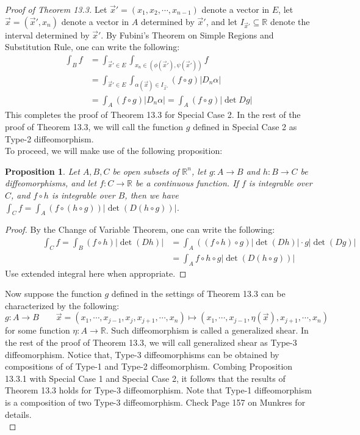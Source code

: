 \documentclass[15pt]{book}
\theoremstyle{break}
\theoremstyle{break}
\newtheorem{prop}[lem]{Proposition}
\newcommand{\R}{\mathbb{R}}
\begin{document}
\begin{proof}[Proof of Theorem 13.3]
Let $\vec{x}' = (x_1,x_2,\cdots,x_{n-1})$ denote a vector in $E$, let $\vec{x} = (\vec{x}',x_n)$ denote a vector in $A$ determined by $\vec{x}'$, and let $I_{\vec{x}'}\subseteq \R$ denote the interval determined by $\vec{x}'$. By Fubini's Theorem on Simple Regions and Substitution Rule, one can write the following:
\begin{align*}
\int_B f &= \int_{\vec{x}' \in E} \int_{x_n \in (\phi(\vec{x}'), \psi(\vec{x}'))} f \\
&= \int_{\vec{x}' \in E} \int_{\alpha(\vec{x}) \in I_{\vec{x}'}} (f\circ g) |D_n\alpha| \\
&= \int_A (f\circ g) |D_n\alpha| = \int_A (f\circ g) |\det Dg|
\end{align*}
This completes the proof of Theorem 13.3 for Special Case 2. In the rest of the proof of Theorem 13.3, we will call the function $g$ defined in Special Case 2 as Type-2 diffeomorphism. \\


\newpage
To proceed, we will make use of the following proposition:
\begin{prop}
\setlength{\leftskip}{1cm}Let $A,B,C$ be open subsets of $\R^n$, let $g:A \to B$ and $h:B \to C$ be diffeomorphisms, and let $f:C \to \R$ be a continuous function. If $f$ is integrable over $C$, and $f\circ h$ is integrable over $B$, then we have $\int_C f =\int_A (f\circ (h \circ g))| \det(D(h\circ g))|$. 
\end{prop}
\begin{proof}\setlength{\leftskip}{1cm}By the Change of Variable Theorem, one can write the following:
\begin{align*}
\qquad\qquad\int_C f = \int_B (f\circ h) |\det(D h)| &= \int_A ((f\circ h) \circ g) |\det (Dh)| \cdot g |\det(Dg)| \\
&= \int_A f\circ h \circ g |\det (D(h\circ g))|
\end{align*}
Use extended integral here when appropriate.
\end{proof}

Now suppose the function $g$ defined in the settings of Theorem 13.3 can be characterized by the following: $$g:A \to B \qquad\vec{x} =(x_1,\cdots,x_{j-1},x_j,x_{j+1},\cdots, x_n) \mapsto (x_1,\cdots, x_{j-1}, \eta(\vec{x}), x_{j+1},\cdots, x_n)$$
for some function $\eta:A \to \R$. Such diffeomorphism is called a generalized shear. In the rest of the proof of Theorem 13.3, we will call generalized shear as Type-3 diffeomorphism. Notice that, Type-3 diffeomorphisms can be obtained by compositions of of Type-1 and Type-2 diffeomorphism. Combing Proposition 13.3.1 with Special Case 1 and Special Case 2, it follows that the results of Theorem 13.3 holds for Type-3 diffeomorphism. Note that Type-1 diffeomorphism is a composition of two Type-3 diffeomorphism. Check Page 157 on Munkres for details.\\


\end{proof}
\end{document}
